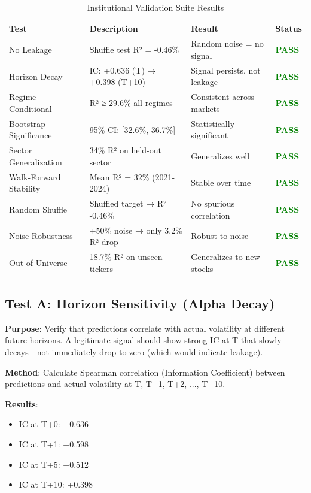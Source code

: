 \documentclass[12pt,a4paper]{article}
\begin{document}
\begin{table}[H]
\centering
\begin{tabular}{llll}
\toprule
\textbf{Test} & \textbf{Description} & \textbf{Result} & \textbf{Status} \\
\midrule
No Leakage & Shuffle test R² = -0.46\% & Random noise = no signal & \textcolor{green}{\textbf{PASS}} \\
Horizon Decay & IC: +0.636 (T) → +0.398 (T+10) & Signal persists, not leakage & \textcolor{green}{\textbf{PASS}} \\
Regime-Conditional & R² ≥ 29.6\% all regimes & Consistent across markets & \textcolor{green}{\textbf{PASS}} \\
Bootstrap Significance & 95\% CI: [32.6\%, 36.7\%] & Statistically significant & \textcolor{green}{\textbf{PASS}} \\
Sector Generalization & 34\% R² on held-out sector & Generalizes well & \textcolor{green}{\textbf{PASS}} \\
Walk-Forward Stability & Mean R² = 32\% (2021-2024) & Stable over time & \textcolor{green}{\textbf{PASS}} \\
Random Shuffle & Shuffled target → R² = -0.46\% & No spurious correlation & \textcolor{green}{\textbf{PASS}} \\
Noise Robustness & +50\% noise → only 3.2\% R² drop & Robust to noise & \textcolor{green}{\textbf{PASS}} \\
Out-of-Universe & 18.7\% R² on unseen tickers & Generalizes to new stocks & \textcolor{green}{\textbf{PASS}} \\
\bottomrule
\end{tabular}
\caption{Institutional Validation Suite Results}
\label{tab:validation}
\end{table}

\subsection{Test A: Horizon Sensitivity (Alpha Decay)}

\textbf{Purpose}: Verify that predictions correlate with actual volatility at different future horizons. A legitimate signal should show strong IC at T that slowly decays—not immediately drop to zero (which would indicate leakage).

\textbf{Method}: Calculate Spearman correlation (Information Coefficient) between predictions and actual volatility at T, T+1, T+2, ..., T+10.

\textbf{Results}:
\begin{itemize}
    \item IC at T+0: +0.636
    \item IC at T+1: +0.598
    \item IC at T+5: +0.512
    \item IC at T+10: +0.398
\end{itemize}
\end{document}
